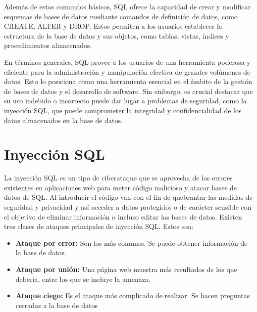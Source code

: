 \documentclass[11pt]{report}
\begin{document}
Además de estos comandos básicos, SQL ofrece la capacidad de crear y modificar
esquemas de bases de datos mediante comandos de definición de datos, como CREATE,
ALTER y DROP. Estos permiten a los usuarios establecer la estructura de la base de datos
y sus objetos, como tablas, vistas, índices y procedimientos almacenados.

En términos generales, SQL provee a los usuarios de una herramienta poderosa y eficiente
para la administración y manipulación efectiva de grandes volúmenes de datos. Esto lo
posiciona como una herramienta esencial en el ámbito de la gestión de bases de datos y el
desarrollo de software. Sin embargo, es crucial destacar que su uso indebido o incorrecto
puede dar lugar a problemas de seguridad, como la inyección SQL, que puede
comprometer la integridad y confidencialidad de los datos almacenados en la base de datos.

\section{Inyección SQL}
La inyección SQL es un tipo de ciberataque que se aprovecha de los errores existentes en
aplicaciones web para meter código malicioso y atacar bases de datos de SQL. Al introducir
el código van con el fin de quebrantar las medidas de seguridad y privacidad y así acceder a
datos protegidos o de carácter sensible con el objetivo de eliminar información o incluso
editar las bases de datos.
Existen tres clases de ataques principales de inyección SQL. Estos son:
\begin{itemize}
\item \textbf{Ataque por error:} Son los más comunes. Se puede obtener información de la base
de datos.
\item \textbf{Ataque por unión:} Una página web muestra más resultados de los que debería,
entre los que se incluye la amenaza.
\item \textbf{Ataque ciego:} Es el ataque más complicado de realizar. Se hacen preguntas
cerradas a la base de datos
\end{itemize}
\end{document}
